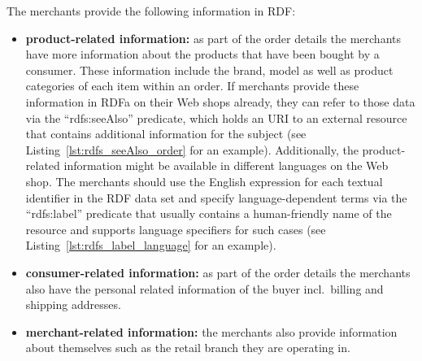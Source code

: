The merchants provide the following information in \gls{RDF}:\@

\begin{itemize}
  \item \textbf{product-related information:} as part of the order details the merchants have more information about the products that have been bought by a consumer. These information include the brand, model as well as product categories of each item within an order. If merchants provide these information in \gls{RDFa} on their Web shops already, they can refer to those data via the ``rdfs:seeAlso'' predicate, which holds an \gls{URI} to an external resource that contains additional information for the subject (see Listing~\ref{lst:rdfs_seeAlso_order} for an example). Additionally, the product-related information might be available in different languages on the Web shop. The merchants should use the English expression for each textual identifier in the \gls{RDF} data set and specify language-dependent terms via the ``rdfs:label'' predicate that usually contains a human-friendly name of the resource and supports language specifiers for such cases (see Listing~\ref{lst:rdfs_label_language} for an example).
  \item \textbf{consumer-related information:} as part of the order details the merchants also have the personal related information of the buyer incl.\ billing and shipping addresses.
  \item \textbf{merchant-related information:} the merchants also provide information about themselves such as the retail branch they are operating in.
\end{itemize}





